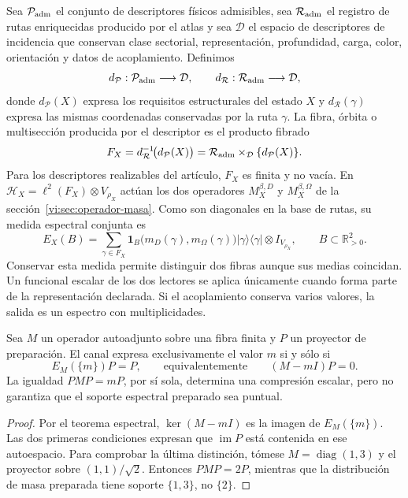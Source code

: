 Sea \(\mathcal P_{\rm adm}\) el conjunto de descriptores físicos admisibles,
sea \(\mathcal R_{\rm adm}\) el registro de rutas enriquecidas producido por
el atlas y sea \(\mathcal D\) el espacio de descriptores de incidencia que
conservan clase sectorial, representación, profundidad, carga, color,
orientación y datos de acoplamiento. Definimos
\[
 d_{\mathcal P}:\mathcal P_{\rm adm}\longrightarrow\mathcal D,
 \qquad
 d_{\mathcal R}:\mathcal R_{\rm adm}\longrightarrow\mathcal D,
\]
donde \(d_{\mathcal P}(X)\) expresa los requisitos estructurales del estado
\(X\) y \(d_{\mathcal R}(\gamma)\) expresa las mismas coordenadas conservadas
por la ruta \(\gamma\). La fibra, órbita o multisección producida por el
descriptor es el producto fibrado
\begin{equation}
 F_X=d_{\mathcal R}^{-1}\!\bigl(d_{\mathcal P}(X)\bigr)
 =\mathcal R_{\rm adm}\times_{\mathcal D}\{d_{\mathcal P}(X)\}.
 \label{vi:eq:fibra-descriptor}
\end{equation}
Para los descriptores realizables del artículo, \(F_X\) es finita y no vacía.
En
\(\mathcal H_X=\ell^2(F_X)\otimes V_{\rho_X}\) actúan los dos operadores
\(M_X^{\beta,D}\) y \(M_X^{\beta,\Omega}\) de la
sección~\ref{vi:sec:operador-masa}. Como son diagonales en la base de
rutas, su medida espectral conjunta es
\begin{equation}
 E_X(B)=\sum_{\gamma\in F_X}
 \mathbf1_B\bigl(m_D(\gamma),m_\Omega(\gamma)\bigr)
 |\gamma\rangle\langle\gamma|\otimes I_{V_{\rho_X}},
 \qquad B\subset\mathbb R_{>0}^2.
 \label{vi:eq:familias-pvm}
\end{equation}
Conservar esta medida permite distinguir dos fibras aunque sus medias
coincidan. Un funcional escalar de los dos lectores se aplica únicamente
cuando forma parte de la representación declarada. Si el acoplamiento
conserva varios valores, la salida es un espectro con multiplicidades.

\begin{proposition}
\label{vi:prop:familias-linea}
Sea \(M\) un operador autoadjunto sobre una fibra finita y \(P\) un
proyector de preparación. El canal expresa exclusivamente el valor \(m\)
si y sólo si
\[
 E_M(\{m\})P=P,
 \qquad\text{equivalentemente}\qquad (M-mI)P=0.
\]
La igualdad \(PMP=mP\), por sí sola, determina una compresión escalar,
pero no garantiza que el soporte espectral preparado sea puntual.
\end{proposition}
\begin{proof}
Por el teorema espectral, \(\ker(M-mI)\) es la imagen de
\(E_M(\{m\})\). Las dos primeras condiciones expresan que
\(\operatorname{im}P\) está contenida en ese autoespacio. Para comprobar
la última distinción, tómese \(M=\operatorname{diag}(1,3)\) y el proyector
sobre \((1,1)/\sqrt2\). Entonces \(PMP=2P\), mientras que la distribución
de masa preparada tiene soporte \(\{1,3\}\), no \(\{2\}\).
\end{proof}

